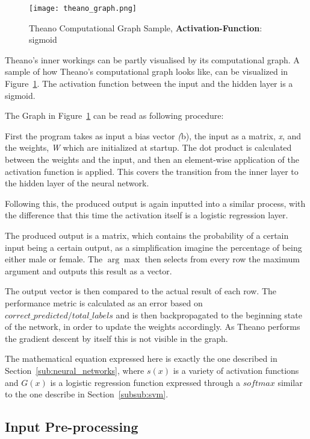 \documentclass[12pt]{article}
\begin{document}
\begin{figure}[ht]
    \texttt{[image: theano\_graph.png]} 
    \caption{Theano Computational Graph Sample, \textbf{Activation-Function}: sigmoid\protect\footnotemark}
    \label{fig:theano_graph}
\end{figure}
Theano's inner workings can be partly visualised by its computational graph. A sample of how Theano's computational graph looks like, can be visualized in Figure~\ref{fig:theano_graph}. The activation function between the input and the hidden layer is a sigmoid. 

The Graph in Figure~\ref{fig:theano_graph} can be read as following procedure: 

First the program takes as input a bias vector \emph(b), the input as a matrix, \emph{x}, and the weights, \emph{W} which are initialized at startup. The dot product is calculated between the weights and the input, and then an element-wise application of the activation function is applied. This covers the transition from the inner layer to the hidden layer of the neural network.

Following this, the produced output is again inputted into a similar process, with the difference that this time the activation itself is a logistic regression layer. 

The produced output is a matrix, which contains the probability of a certain input being a certain output, as a simplification imagine the percentage of being either male or female. The $\arg \max$ then selects from every row the maximum argument and outputs this result as a vector. 

The output vector is then compared to the actual result of each row. The performance metric is calculated as an error based on $correct\_predicted/total\_labels$ and is then backpropagated to the beginning state of the network, in order to update the weights accordingly. As Theano performs the gradient descent by itself this is not visible in the graph.

The mathematical equation expressed here is exactly the one described in Section~\ref{sub:neural_networks}, where $s(x)$ is a variety of activation functions and $G(x)$ is a logistic regression function expressed through a $softmax$ similar to the one describe in Section~\ref{subsub:svm}.

\subsection{Input Pre-processing}
\label{sub:splitfunc}
\end{document}
